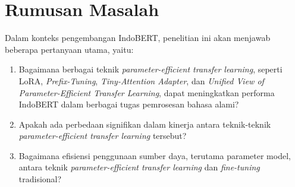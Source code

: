 \section{Rumusan Masalah}

Dalam konteks pengembangan IndoBERT, penelitian ini akan menjawab beberapa pertanyaan utama, yaitu:

\begin{enumerate}
    \item Bagaimana berbagai teknik \textit{parameter-efficient transfer learning}, seperti LoRA, \textit{Prefix-Tuning}, \textit{Tiny-Attention Adapter}, dan \textit{Unified View of Parameter-Efficient Transfer Learning}, dapat meningkatkan performa IndoBERT dalam berbagai tugas pemrosesan bahasa alami?
    \item Apakah ada perbedaan signifikan dalam kinerja antara teknik-teknik \textit{parameter-efficient transfer learning} tersebut?
    \item Bagaimana efisiensi penggunaan sumber daya, terutama parameter model, antara teknik \textit{parameter-efficient transfer learning} dan \textit{fine-tuning} tradisional?
\end{enumerate}